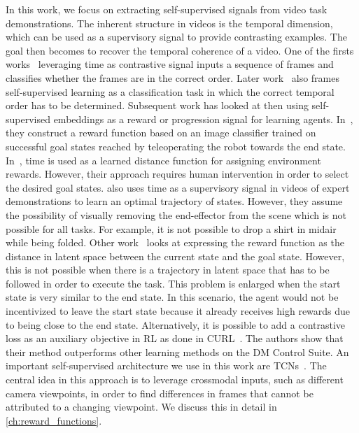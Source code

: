 \documentclass[\home/main.tex]{subfiles}
\begin{document}
In this work, we focus on extracting self-supervised signals from video task demonstrations. The inherent structure in videos is the temporal dimension, which can be used as a supervisory signal to provide contrasting examples. The goal then becomes to recover the temporal coherence of a video. One of the firsts works~\cite{Misra2016} leveraging time as contrastive signal inputs a sequence of frames and classifies whether the frames are in the correct order. Later work~\cite{Lee2017,Fernando2017} also frames self-supervised learning as a classification task in which the correct temporal order has to be determined. Subsequent work has looked at then using self-supervised embeddings as a reward or progression signal for learning agents. 
In~\cite{Singh2019}, they construct a reward function based on an image classifier trained on successful goal states reached by teleoperating the robot towards the end state. In~\cite{Hartikainen2019}, time is used as a learned distance function for assigning environment rewards. However, their approach requires human intervention in order to select the desired goal states. \cite{Nair2018time} also uses time as a supervisory signal in videos of expert demonstrations to learn an optimal trajectory of states. However, they assume the possibility of visually removing the end-effector from the scene which is not possible for all tasks. For example, it is not possible to drop a shirt in midair while being folded. Other work~\cite{Nair2018visual} looks at expressing the reward function as the distance in latent space between the current state and the goal state. However, this is not possible when there is a trajectory in latent space that has to be followed in order to execute the task. This problem is enlarged when the start state is very similar to the end state. In this scenario, the agent would not be incentivized to leave the start state because it already receives high rewards due to being close to the end state. %
Alternatively, it is possible to add a contrastive loss as an auxiliary objective in RL as done in CURL~\cite{Srinivas2020CURL}. The authors show that their method outperforms other learning methods on the DM Control Suite.
An important self-supervised architecture we use in this work are \glspl{TCN}~\autocite{Sermanet2017TCN}. The central idea in this approach is to leverage crossmodal inputs, such as different camera viewpoints, in order to find differences in frames that cannot be attributed to a changing viewpoint. We discuss this in detail in \cref{ch:reward_functions}.
\end{document}
